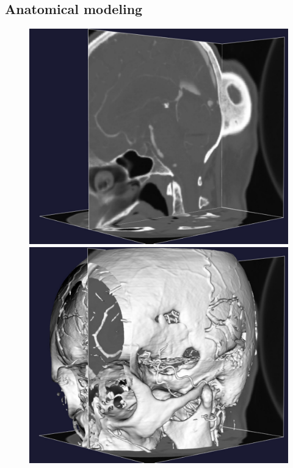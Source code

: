 \subsection{Anatomical modeling} \label{vmtk}

\begin{figure}
\bwfig
          {\includegraphics[width=\threefigsfull]{chapters/kvs-2/pdf/stacks.pdf}
            \includegraphics[width=\threefigsfull]{chapters/kvs-2/pdf/3d.pdf}
}
\end{figure}
